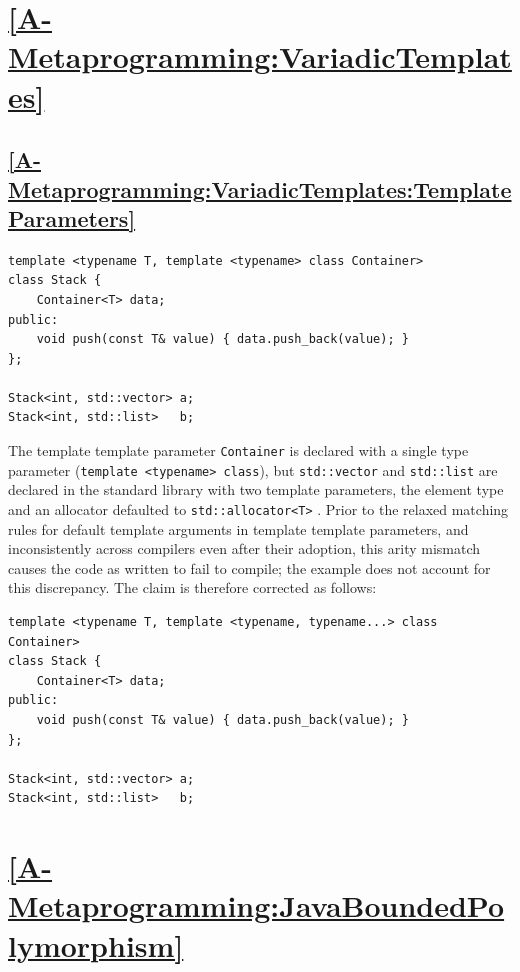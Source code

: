 \documentclass[11pt]{report}
\begin{document}
\section*{\hyperref[A-Metaprogramming:VariadicTemplates]{\ref*{A-Metaprogramming:VariadicTemplates} }}

\subsection*{\hyperref[A-Metaprogramming:VariadicTemplates:TemplateParameters]{\ref*{A-Metaprogramming:VariadicTemplates:TemplateParameters} }}
\begin{Verbatim}[breaklines=true]
template <typename T, template <typename> class Container>
class Stack {
    Container<T> data;
public:
    void push(const T& value) { data.push_back(value); }
};

Stack<int, std::vector> a;
Stack<int, std::list>   b;
\end{Verbatim}

The template template parameter \texttt{Container} is declared with a
single type parameter (\texttt{template <typename> class}), but
\texttt{std::vector} and \texttt{std::list} are declared in the standard
library with two template parameters, the element type and an allocator
defaulted to \texttt{std::allocator<T>} \cite{iso_cpp2024}. Prior to the
relaxed matching rules for default template arguments in template template
parameters, and inconsistently across compilers even after their adoption,
this arity mismatch causes the code as written to fail to compile; the
example does not account for this discrepancy. The claim is therefore
corrected as follows:

\begin{Verbatim}[breaklines=true]
template <typename T, template <typename, typename...> class Container>
class Stack {
    Container<T> data;
public:
    void push(const T& value) { data.push_back(value); }
};

Stack<int, std::vector> a;
Stack<int, std::list>   b;
\end{Verbatim}

\section*{\hyperref[A-Metaprogramming:JavaBoundedPolymorphism]{\ref*{A-Metaprogramming:JavaBoundedPolymorphism} }}
\end{document}

